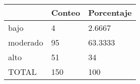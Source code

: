 \begin{tabular}{lll}
& Conteo & Porcentaje \\ 
\hline 
bajo & 4 & 2.6667 \\ 
moderado & 95 & 63.3333 \\ 
alto & 51 & 34 \\ 
TOTAL & 150 & 100 \\ 
\hline 
\end{tabular}